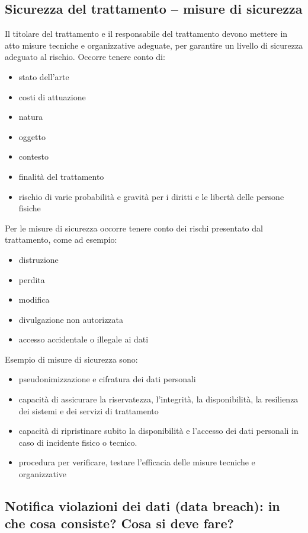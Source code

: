 \subsection{Sicurezza del trattamento – misure di sicurezza}

Il titolare del trattamento e il responsabile del trattamento devono mettere in
atto misure tecniche e organizzative adeguate, per garantire un livello di
sicurezza adeguato al rischio.
Occorre tenere conto di:
\begin{itemize}
    \item stato dell'arte
    \item costi di attuazione
    \item natura
    \item oggetto
    \item contesto
    \item finalità del trattamento
    \item rischio di varie probabilità e gravità per i diritti e le libertà delle persone fisiche
\end{itemize}
Per le misure di sicurezza occorre tenere conto dei rischi presentato dal trattamento, come ad esempio:
\begin{itemize}
    \item distruzione
    \item perdita
    \item modifica
    \item divulgazione non autorizzata
    \item accesso accidentale o illegale ai dati
\end{itemize}
Esempio di misure di sicurezza sono:
\begin{itemize}
    \item pseudonimizzazione e cifratura dei dati personali
    \item capacità di assicurare la riservatezza, l'integrità, la
        disponibilità, la resilienza dei sistemi e dei servizi di trattamento
    \item capacità di ripristinare subito la disponibilità e l'accesso dei dati
        personali in caso di incidente fisico o tecnico.
    \item procedura per verificare, testare l'efficacia delle misure tecniche e
        organizzative
\end{itemize}

\subsection{Notifica violazioni dei dati (data breach): in che cosa consiste? Cosa si deve fare?}

